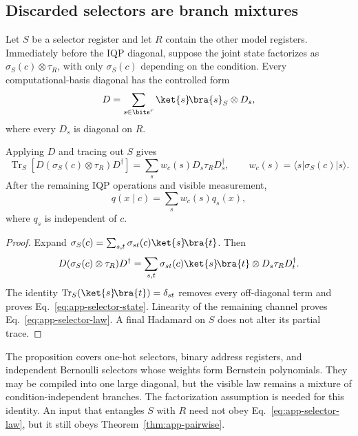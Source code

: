 \subsection{Discarded selectors are branch mixtures}

Let $S$ be a selector register and let $R$ contain the other model registers.
Immediately before the IQP diagonal, suppose the joint state factorizes as
$\sigma_S(c)\otimes\tau_R$, with only $\sigma_S(c)$ depending on the
condition. Every computational-basis diagonal has the controlled form
\begin{equation}
 D=\sum_{s\in\bits^r}\ket{s}\!\bra{s}_S\otimes D_s,
 \label{eq:app-controlled-diagonal}
\end{equation}
where every $D_s$ is diagonal on $R$.

\begin{proposition}
\label{prop:app-selector-mixture}
Applying $D$ and tracing out $S$ gives
\begin{equation}
 \operatorname{Tr}_S\!\left[
 D(\sigma_S(c)\otimes\tau_R)D^\dagger\right]
 =\sum_s w_c(s)D_s\tau_RD_s^\dagger,
 \qquad
 w_c(s)=\langle s|\sigma_S(c)|s\rangle.
 \label{eq:app-selector-state}
\end{equation}
After the remaining IQP operations and visible measurement,
\begin{equation}
 q(x\mid c)=\sum_s w_c(s)q_s(x),
 \label{eq:app-selector-law}
\end{equation}
where $q_s$ is independent of $c$.
\end{proposition}

\begin{proof}
Expand
$\sigma_S(c)=\sum_{s,t}\sigma_{st}(c)\ket{s}\!\bra{t}$. Then
\begin{equation}
 D(\sigma_S(c)\otimes\tau_R)D^\dagger
 =\sum_{s,t}\sigma_{st}(c)\ket{s}\!\bra{t}
 \otimes D_s\tau_RD_t^\dagger.
\end{equation}
The identity
$\operatorname{Tr}_S(\ket{s}\!\bra{t})=\delta_{st}$ removes every
off-diagonal term and proves Eq.~\eqref{eq:app-selector-state}. Linearity of
the remaining channel proves Eq.~\eqref{eq:app-selector-law}. A final
Hadamard on $S$ does not alter its partial trace.
\end{proof}

The proposition covers one-hot selectors, binary address registers, and
independent Bernoulli selectors whose weights form Bernstein polynomials.
They may be compiled into one large diagonal, but the visible law remains a
mixture of condition-independent branches. The factorization assumption is
needed for this identity. An input that entangles $S$ with $R$ need not obey
Eq.~\eqref{eq:app-selector-law}, but it still obeys
Theorem~\ref{thm:app-pairwise}.

